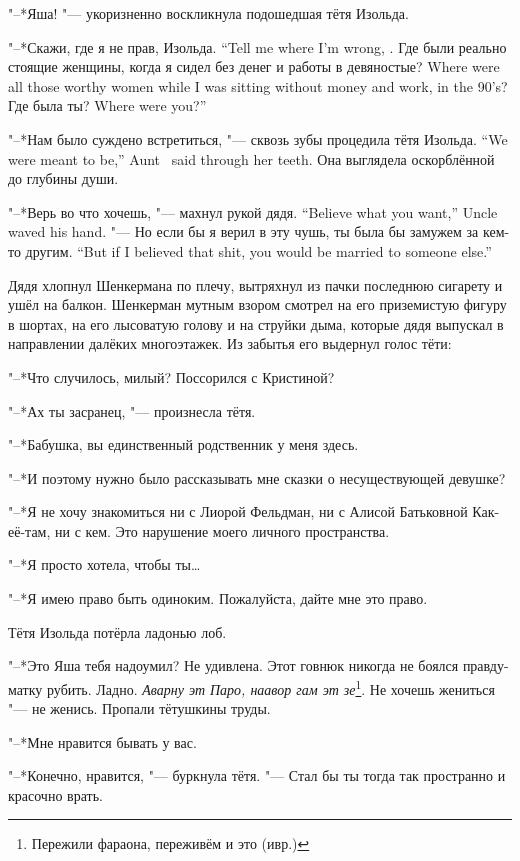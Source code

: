 "--*Яша! "--- укоризненно воскликнула подошедшая тётя Изольда.

{"--*Скажи, где я не прав, Изольда.}
{``Tell me where I'm wrong, \Izolda.}
{Где были реально стоящие женщины, когда я сидел без денег и работы в девяностые?}
{Where were all those worthy women while I was sitting without money and work, in the 90's?}
{Где была ты?}
{Where were you?''}

{"--*Нам было суждено встретиться, "--- сквозь зубы процедила тётя Изольда.}
{``We were meant to be,'' Aunt \Izolda\ said through her teeth.}
Она выглядела оскорблённой до глубины души.

{"--*Верь во что хочешь, "--- махнул рукой дядя.}
{``Believe what you want,'' Uncle waved his hand.}
{"--- Но если бы я верил в эту чушь, ты была бы замужем за кем-то другим.}
{``But if I believed that shit, you would be married to someone else.''}

Дядя хлопнул Шенкермана по плечу, вытряхнул из пачки последнюю сигарету и ушёл на балкон.
Шенкерман мутным взором смотрел на его приземистую фигуру в шортах, на его лысоватую голову и на струйки дыма, которые дядя выпускал в направлении далёких многоэтажек.
Из забытья его выдернул голос тёти:

"--*Что случилось, милый?
Поссорился с Кристиной?

\asterism

"--*Ах ты засранец, "--- произнесла тётя.

"--*Бабушка, вы единственный родственник у меня здесь.

"--*И поэтому нужно было рассказывать мне сказки о несуществующей девушке?

"--*Я не хочу знакомиться ни с Лиорой Фельдман, ни с Алисой Батьковной Как-её-там, ни с кем.
Это нарушение моего личного пространства.

"--*Я просто хотела, чтобы ты\ldots{}

"--*Я имею право быть одиноким.
Пожалуйста, дайте мне это право.

Тётя Изольда потёрла ладонью лоб.

"--*Это Яша тебя надоумил?
Не удивлена.
Этот говнюк никогда не боялся правду-матку рубить.
Ладно.
\textit{Аварну эт Паро, наавор гам эт зе}\footnote{Пережили фараона, переживём и это (ивр.)}.
Не хочешь жениться "--- не женись.
Пропали тётушкины труды.

"--*Мне нравится бывать у вас.

"--*Конечно, нравится, "--- буркнула тётя.
"--- Стал бы ты тогда так пространно и красочно врать.

